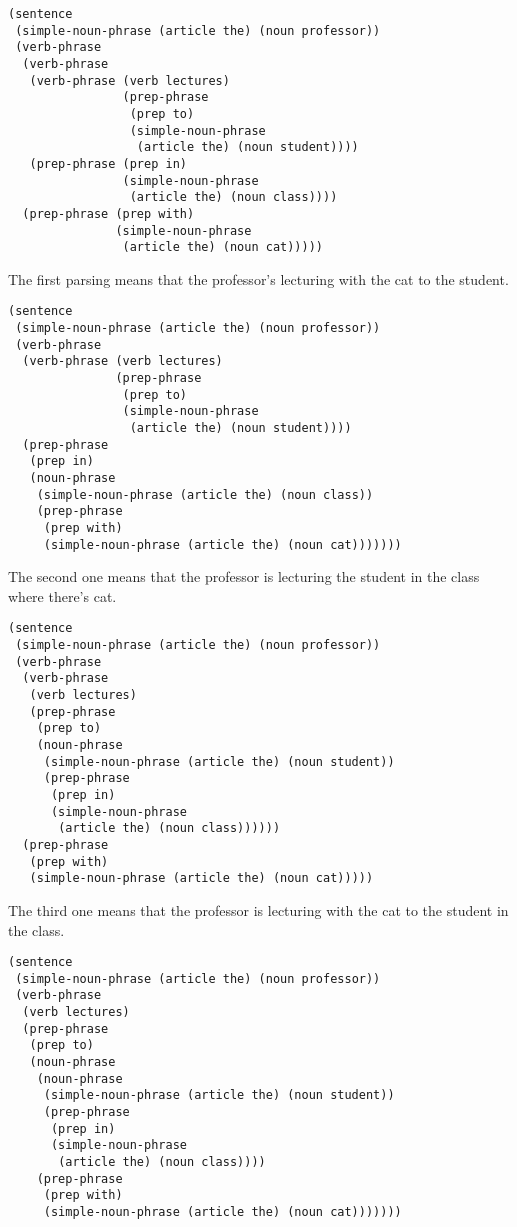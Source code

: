 \documentclass[a4paper,12pt]{article}
\begin{document}
\begin{lstlisting}
(sentence
 (simple-noun-phrase (article the) (noun professor))
 (verb-phrase
  (verb-phrase
   (verb-phrase (verb lectures)
                (prep-phrase
                 (prep to)
                 (simple-noun-phrase
                  (article the) (noun student))))
   (prep-phrase (prep in)
                (simple-noun-phrase
                 (article the) (noun class))))
  (prep-phrase (prep with)
               (simple-noun-phrase
                (article the) (noun cat)))))
\end{lstlisting}

The first parsing means that the professor's lecturing with  the cat
to the student.

\begin{lstlisting}
(sentence
 (simple-noun-phrase (article the) (noun professor))
 (verb-phrase
  (verb-phrase (verb lectures)
               (prep-phrase
                (prep to)
                (simple-noun-phrase
                 (article the) (noun student))))
  (prep-phrase
   (prep in)
   (noun-phrase
    (simple-noun-phrase (article the) (noun class))
    (prep-phrase
     (prep with)
     (simple-noun-phrase (article the) (noun cat)))))))
\end{lstlisting}

The second one means that the professor is lecturing the student in
the class where there's cat.

\begin{lstlisting}
(sentence
 (simple-noun-phrase (article the) (noun professor))
 (verb-phrase
  (verb-phrase
   (verb lectures)
   (prep-phrase
    (prep to)
    (noun-phrase
     (simple-noun-phrase (article the) (noun student))
     (prep-phrase
      (prep in)
      (simple-noun-phrase
       (article the) (noun class))))))
  (prep-phrase
   (prep with)
   (simple-noun-phrase (article the) (noun cat)))))
\end{lstlisting}

The third one means that the professor is lecturing with the cat to
the student in the class.

\begin{lstlisting}
(sentence
 (simple-noun-phrase (article the) (noun professor))
 (verb-phrase
  (verb lectures)
  (prep-phrase
   (prep to)
   (noun-phrase
    (noun-phrase
     (simple-noun-phrase (article the) (noun student))
     (prep-phrase
      (prep in)
      (simple-noun-phrase
       (article the) (noun class))))
    (prep-phrase
     (prep with)
     (simple-noun-phrase (article the) (noun cat)))))))
\end{lstlisting}
\end{document}
